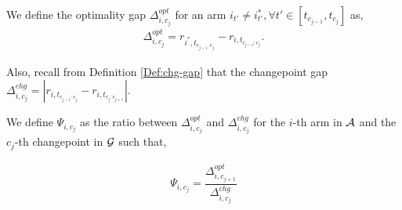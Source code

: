 \begin{definition}
\label{Def:opt-gap}
We define the optimality gap $\Delta^{opt}_{i,c_j}$ for an arm $i_{t'}\neq i^*_{t'},\forall t'\in[t_{c_{j-1}},t_{c_j}]$ as,
\begin{align*}
\Delta^{opt}_{i,c_j}= r_{i^*,t_{c_{j-1}:c_j}}-r_{i,t_{c_{j-1}:c_j}}.
\end{align*}
\end{definition}

Also, recall from Definition \ref{Def:chg-gap} that the changepoint gap $\Delta^{chg}_{i,c_j}=|r_{i,t_{c_{j-1}:c_j}}-r_{i,t_{c_j:c_{j+1}}}|$.



\begin{definition}
\label{Def:ratio}
We define $\Psi_{i,c_j}$ as the ratio between $\Delta^{opt}_{i,c_j}$ and $\Delta^{chg}_{i,c_j}$ for the $i$-th arm in $\mathcal{A}$ and the $c_j$-th changepoint in $\mathcal{G}$ such that,

\begin{align*}
\Psi_{i,c_j} = \dfrac{\Delta^{opt}_{i,c_{j+1}}}{\Delta^{chg}_{i,c_j}}
\end{align*}

\end{definition}

 
